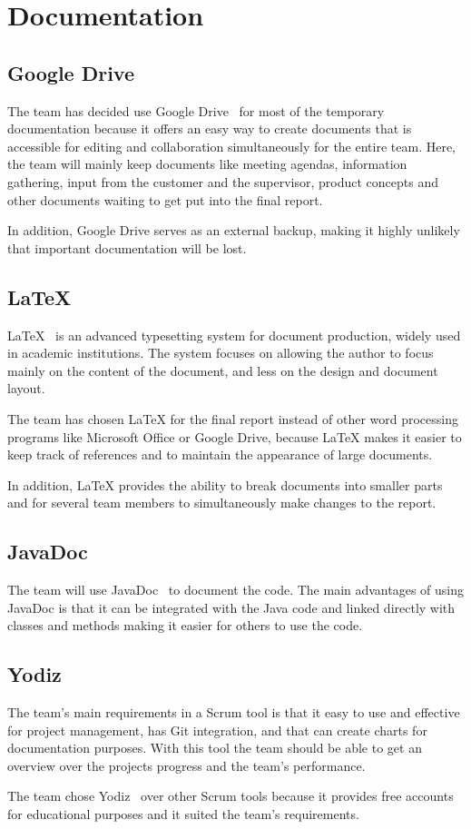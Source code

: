 \section{Documentation}

\subsection{Google Drive}
The team has decided use Google Drive~\cite{gdrive} for most of the temporary documentation because it offers an easy way to create documents that is accessible for editing and collaboration simultaneously for the entire team. Here, the team will mainly 
keep documents like meeting agendas, information gathering, input from the customer and the supervisor, product concepts and other documents waiting to get put into the final report. 

In addition, Google Drive serves as an external backup, making it highly unlikely that important documentation will be lost. 


\subsection{\LaTeX}
LaTeX~\cite{latex} is an advanced typesetting system for document production, widely used in
academic institutions. The system focuses on allowing the author to focus mainly on the content of the document, and less on the design and document layout.

The team has chosen LaTeX for the final report instead of other word processing programs like Microsoft Office or Google Drive, because LaTeX makes it easier to keep track of references and to maintain the appearance of large
documents. 

In addition, LaTeX provides the ability to break documents into smaller parts and for several team members to simultaneously make changes to the report.


\subsection{JavaDoc}
The team will use JavaDoc~\cite{javadoc} to document the code. The main advantages of using JavaDoc is that it can be integrated with the Java code and linked directly with classes and methods making it easier for others to use the code.

\subsection{Yodiz}
The team's main requirements in a Scrum tool is that it easy to use and effective for project management, has Git integration, and that can create charts for documentation purposes. With this tool the team should be able to get an overview over the projects progress and the team's performance. 

The team chose Yodiz~\cite{yodiz} over other Scrum tools because it provides 
free accounts for educational purposes and it suited the team's requirements. 